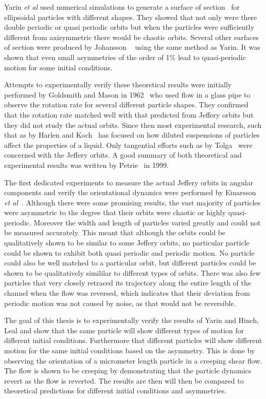 Yarin \emph{et al} used numerical simulations to generate a surface of section~\cite{SurfaceOfSection} for ellipsoidal particles with different shapes. They showed that not only were there double periodic or quasi periodic orbits but when the particles were sufficiently different from axisymmetric there would be chaotic orbits. 
Several other surfaces of section were produced by Johansson ~\cite{AntonThesis} using the same method as Yarin. It was shown that even small asymmetries of the order of 1\% lead to quasi-periodic motion for some initial conditions.

Attempts to experimentally verify these theoretical results were initially performed by Goldsmith and Mason in 1962~\cite{Mason} who used flow in a glass pipe to observe the rotation rate for several different particle shapes. They confirmed that the rotation rate matched well with that predicted from Jeffery orbits but they did not study the actual orbits. Since then most experimental research, such that as by Harlen and Koch~\cite{fibersspension} has focused on how diluted suspensions of particles affect the properties of a liquid. Only tangential efforts such as by Tolga~\cite{Tolga} were concerned with the Jeffery orbits. A good summary of both theoretical and experimental results was written by Petrie~\cite{Petrie} in 1999.

The first dedicated experiments to measure the actual Jeffery orbits in angular components and verify the orientational dynamics were performed by Einarsson \emph{et al}~\cite{JonasExperiment}. Although there were some promising results, the vast majority of particles were asymmetric to the degree that their orbits were chaotic or highly quasi-periodic. Moreover the width and length of particles varied greatly and could not be measured accurately.
This meant that although the orbits could be qualitatively shown to be similar to some 
Jeffery orbits, no particular particle could be shown to exhibit both quasi periodic and periodic motion. No particle could also be well matched to a particular orbit, but different particles could be shown to be qualitatively simililar to different types of orbits. There was also few particles that very closely retraced its trajectory along the entire length of the channel when the flow was reversed, which indicates that their deviation from periodic motion was not caused by noise, as that would not be reversible.


The goal of this thesis is to experimentally verify the results of Yarin and Hinch, Leal\cite{Yarin, Leal} and show that the same particle will show different types of motion for different initial conditions. Furthermore that different particles will show different motion for the same initial conditions based on the asymmetry. This is done by observing the orientation of a micrometer length particle in a creeping shear flow. The flow is shown to be creeping by demonstrating that the particle dynamics revert as the flow is reverted. The results are then will then be compared to theoretical predictions for different initial conditions and asymmetries.

